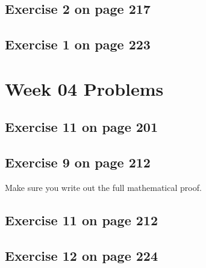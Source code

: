 \documentclass[12pt]{amsart}
\begin{document}
\subsection{Exercise 2 on page 217}
\subsection{ Exercise 1 on page 223} 


\section{Week 04 Problems}
\subsection{Exercise 11 on page 201} 
\subsection{Exercise 9 on page 212} Make sure you write out the full mathematical proof.
\subsection{Exercise 11 on page 212}
\subsection{Exercise 12 on page 224}
\end{document}
